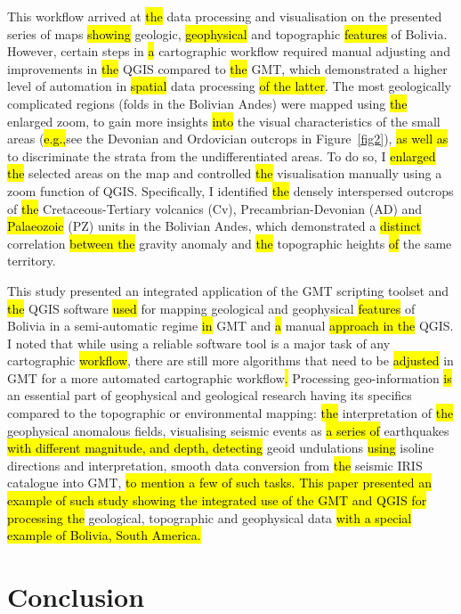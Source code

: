 \documentclass[data,article,submit,pdftex,moreauthors]{Definitions/mdpi}
\begin{document}
This workflow arrived at \hl{the} data processing and visualisation on the presented series of maps \hl{showing} geologic, \hl{geophysical} and topographic \hl{features} of Bolivia. However, certain steps in \hl{a} cartographic workflow required manual adjusting and improvements in \hl{the} QGIS compared to \hl{the} GMT, which demonstrated a higher level of automation in \hl{spatial} data processing \hl{of the latter}. The most geologically complicated regions (folds in the Bolivian Andes) were mapped using \hl{the} enlarged zoom, to gain more insights \hl{into} the visual characteristics of the small areas (\hl{e.g.,}see the Devonian and Ordovician outcrops in Figure~\ref{fig2}), \hl{as well as} to discriminate the strata from the undifferentiated areas. To do so, I \hl{enlarged the} selected areas on the map\hl{ }and controlled \hl{the} visualisation manually using a zoom function of QGIS. Specifically, I identified \hl{the} densely interspersed outcrops of \hl{the} Cretaceous-Tertiary volcanics (Cv), Precambrian-Devonian (AD) and \hl{Palaeozoic} (PZ) units\hl{ }in the Bolivian Andes, which demonstrated a \hl{distinct} correlation \hl{between the} gravity anomaly and \hl{the} topographic heights \hl{of} the same territory. 

This study presented an integrated application of the GMT scripting toolset and \hl{the} QGIS software \hl{used} for mapping geological and geophysical \hl{features} of Bolivia in a semi-automatic regime \hl{in} GMT and \hl{a} manual \hl{approach in the} QGIS. I noted that while using a reliable software tool is a major task of any cartographic \hl{workflow}, there are still more algorithms that need to be \hl{adjusted} in GMT for a more automated cartographic workflow\hl{. }Processing geo-information\hl{ is} an essential part of geophysical and geological research having its specifics compared to the topographic or environmental mapping: \hl{the} interpretation of \hl{the} geophysical anomalous fields, visualising seismic events as \hl{a series of} earthquakes \hl{with different magnitude, and depth, detecting} geoid undulations \hl{using} isoline directions and interpretation, smooth data conversion from \hl{the} seismic IRIS catalogue into GMT, \hl{to mention a few of such tasks. This paper presented an example of such study showing the integrated use of the GMT and QGIS for processing the} geological, topographic and geophysical data\hl{ with a special example of Bolivia, South America.} 

\section{Conclusion}
\end{document}
